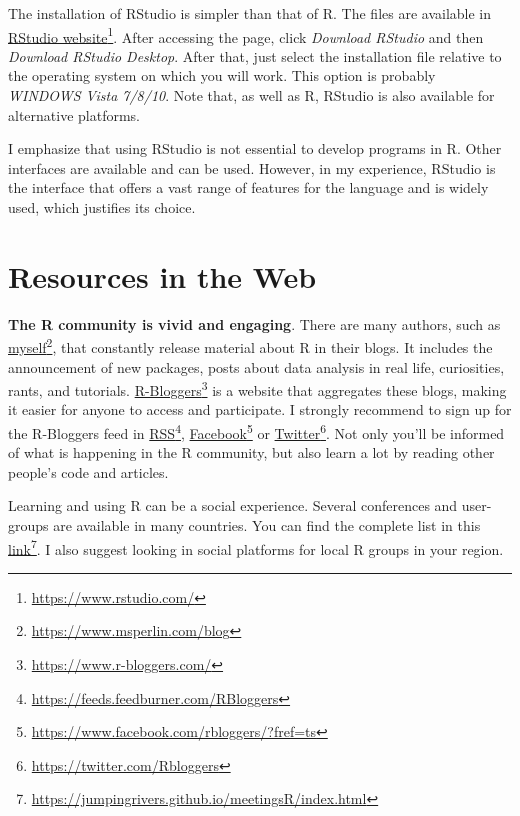 \documentclass[
  12pt,
]{book}
\begin{document}
The installation of RStudio is simpler than that of R. The files are available in \href{https://www.rstudio.com/}{RStudio website}\footnote{\url{https://www.rstudio.com/}}. After accessing the page, click \emph{Download RStudio} and then \emph{Download RStudio Desktop}. After that, just select the installation file relative to the operating system on which you will work. This option is probably \emph{WINDOWS Vista 7/8/10}. Note that, as well as R, RStudio is also available for alternative platforms.

I emphasize that using RStudio is not essential to develop programs in R. Other interfaces are available and can be used. However, in my experience, RStudio is the interface that offers a vast range of features for the language and is widely used, which justifies its choice.

\hypertarget{resources-in-the-web}{%
\section{Resources in the Web}\label{resources-in-the-web}}

\textbf{The R community is vivid and engaging}. There are many authors, such as \href{https://www.msperlin.com/blog}{myself}\footnote{\url{https://www.msperlin.com/blog}}, that constantly release material about R in their blogs. It includes the announcement of new packages, posts about data analysis in real life, curiosities, rants, and tutorials. \href{https://www.r-bloggers.com/}{R-Bloggers}\footnote{\url{https://www.r-bloggers.com/}} is a website that aggregates these blogs, making it easier for anyone to access and participate. I strongly recommend to sign up for the R-Bloggers feed in \href{https://feeds.feedburner.com/RBloggers}{RSS}\footnote{\url{https://feeds.feedburner.com/RBloggers}}, \href{https://www.facebook.com/rbloggers/?fref=ts}{Facebook}\footnote{\url{https://www.facebook.com/rbloggers/?fref=ts}} or \href{https://twitter.com/Rbloggers}{Twitter}\footnote{\url{https://twitter.com/Rbloggers}}. Not only you'll be informed of what is happening in the R community, but also learn a lot by reading other people's code and articles. 

Learning and using R can be a social experience. Several conferences and user-groups are available in many countries. You can find the complete list in this \href{https://jumpingrivers.github.io/meetingsR/index.html}{link}\footnote{\url{https://jumpingrivers.github.io/meetingsR/index.html}}. I also suggest looking in social platforms for local R groups in your region.
\end{document}
